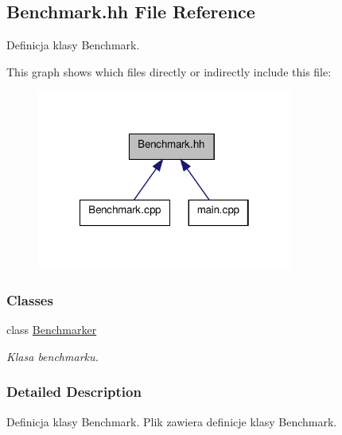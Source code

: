 \hypertarget{a00003}{\subsection{Benchmark.\-hh File Reference}
\label{a00003}
}


Definicja klasy Benchmark.  


This graph shows which files directly or indirectly include this file\-:
\nopagebreak
\begin{figure}[H]
\begin{center}
\leavevmode
\includegraphics[width=238pt]{a00008}
\end{center}
\end{figure}
\subsubsection*{Classes}
\begin{DoxyCompactItemize}
\item 
class \hyperlink{a00001}{Benchmarker}
\begin{DoxyCompactList}\small\item\em Klasa benchmarku. \end{DoxyCompactList}\end{DoxyCompactItemize}


\subsubsection{Detailed Description}
Definicja klasy Benchmark. Plik zawiera definicje klasy Benchmark. 